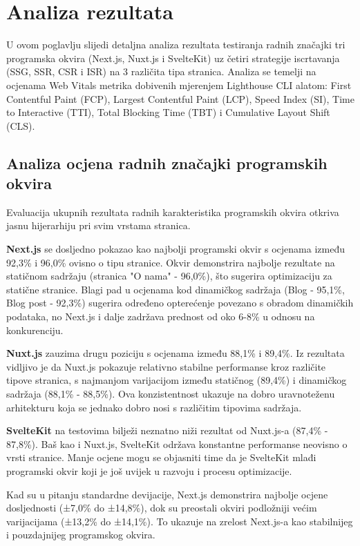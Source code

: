 \section{Analiza rezultata}

U ovom poglavlju slijedi detaljna analiza rezultata testiranja radnih značajki tri programska okvira (Next.js, Nuxt.js i SvelteKit) uz četiri strategije iscrtavanja (SSG, SSR, CSR i ISR) na 3 različita tipa stranica. Analiza se temelji na ocjenama  Web Vitals metrika dobivenih mjerenjem Lighthouse CLI alatom: First Contentful Paint (FCP), Largest Contentful Paint (LCP), Speed Index (SI), Time to Interactive (TTI), Total Blocking Time (TBT) i Cumulative Layout Shift (CLS).

\subsection{Analiza ocjena radnih značajki programskih okvira}

Evaluacija ukupnih rezultata radnih karakteristika programskih okvira otkriva jasnu hijerarhiju pri svim vrstama stranica.

\textbf{Next.js} se dosljedno pokazao kao najbolji programski okvir s ocjenama između 92,3\% i 96,0\% ovisno o tipu stranice. Okvir demonstrira najbolje rezultate na statičnom sadržaju (stranica "O nama" - 96,0\%), što sugerira optimizaciju za statične stranice. Blagi pad u ocjenama kod dinamičkog sadržaja (Blog - 95,1\%, Blog post - 92,3\%) sugerira određeno opterećenje povezano s obradom dinamičkih podataka, no Next.js i dalje zadržava prednost od oko 6-8\% u odnosu na konkurenciju.

\textbf{Nuxt.js} zauzima drugu poziciju s ocjenama između 88,1\% i 89,4\%. Iz rezultata vidljivo je da Nuxt.js pokazuje relativno stabilne performanse kroz različite tipove stranica, s najmanjom varijacijom između statičnog (89,4\%) i dinamičkog sadržaja (88,1\% - 88,5\%). Ova konzistentnost ukazuje na dobro uravnoteženu arhitekturu koja se jednako dobro nosi s različitim tipovima sadržaja.

\textbf{SvelteKit} na testovima bilježi neznatno niži rezultat od Nuxt.js-a (87,4\% - 87,8\%). Baš kao i Nuxt.js, SvelteKit održava konstantne performanse neovisno o vrsti stranice. Manje ocjene mogu se objasniti time da je SvelteKit mlađi programski okvir koji je još uvijek u razvoju i procesu optimizacije.

Kad su u pitanju standardne devijacije, Next.js demonstrira najbolje ocjene dosljednosti (±7,0\% do ±14,8\%), dok su preostali okviri podložniji većim varijacijama (±13,2\% do ±14,1\%). To ukazuje na zrelost Next.js-a kao stabilnijeg i pouzdajnijeg programskog okvira.

